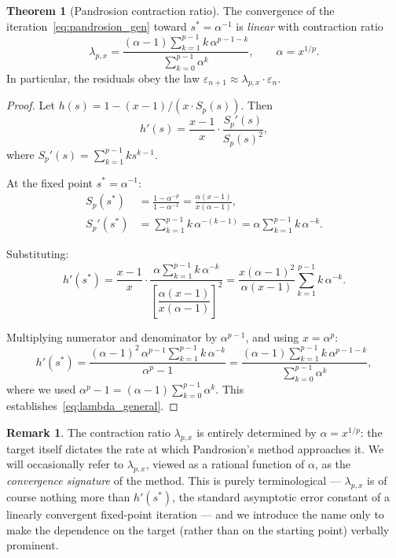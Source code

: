 \documentclass[11pt,a4paper]{article}
\theoremstyle{definition}
\newtheorem{theorem}{Theorem}[section]
\newtheorem{remark}{Remark}[section]
\newcommand{\eps}{\varepsilon}
\begin{document}
\begin{theorem}[Pandrosion contraction ratio]
\label{thm:lambda}
The convergence of the iteration~\eqref{eq:pandrosion_gen} toward $s^* = \alpha^{-1}$ is \emph{linear} with contraction ratio
\begin{equation}
  \label{eq:lambda_general}
  \boxed{
  \lambda_{p,x} = \frac{(\alpha - 1)\displaystyle\sum_{k=1}^{p-1} k\,\alpha^{p-1-k}}{\displaystyle\sum_{k=0}^{p-1} \alpha^k}
  }, \qquad \alpha = x^{1/p}.
\end{equation}
In particular, the residuals obey the law $\eps_{n+1} \approx \lambda_{p,x} \cdot \eps_n$.
\end{theorem}

\begin{proof}
Let $h(s) = 1 - (x-1)/(x \cdot S_p(s))$. Then
\[
  h'(s) = \frac{x-1}{x} \cdot \frac{S_p'(s)}{S_p(s)^2},
\]
where $S_p'(s) = \sum_{k=1}^{p-1} k s^{k-1}$.

At the fixed point $s^* = \alpha^{-1}$:
\begin{align*}
  S_p(s^*) &= \frac{1 - \alpha^{-p}}{1 - \alpha^{-1}} = \frac{\alpha(x-1)}{x(\alpha-1)}, \\
  S_p'(s^*) &= \sum_{k=1}^{p-1} k\,\alpha^{-(k-1)} = \alpha \sum_{k=1}^{p-1} k\,\alpha^{-k}.
\end{align*}

Substituting:
\[
  h'(s^*) = \frac{x-1}{x} \cdot \frac{\alpha \sum_{k=1}^{p-1} k\,\alpha^{-k}}{\left[\dfrac{\alpha(x-1)}{x(\alpha-1)}\right]^2}
  = \frac{x(\alpha-1)^2}{\alpha(x-1)} \sum_{k=1}^{p-1} k\,\alpha^{-k}.
\]

Multiplying numerator and denominator by $\alpha^{p-1}$, and using $x = \alpha^p$:
\[
  h'(s^*) = \frac{(\alpha-1)^2\,\alpha^{p-1}\sum_{k=1}^{p-1}k\,\alpha^{-k}}{\alpha^p - 1}
  = \frac{(\alpha-1)\sum_{k=1}^{p-1}k\,\alpha^{p-1-k}}{\sum_{k=0}^{p-1}\alpha^k},
\]
where we used $\alpha^p - 1 = (\alpha-1)\sum_{k=0}^{p-1}\alpha^k$. This establishes~\eqref{eq:lambda_general}.
\end{proof}

\begin{remark}
The contraction ratio $\lambda_{p,x}$ is entirely determined by $\alpha = x^{1/p}$: the target itself dictates the rate at which Pandrosion's method approaches it. We will occasionally refer to $\lambda_{p,x}$, viewed as a rational function of $\alpha$, as the \emph{convergence signature} of the method. This is purely terminological --- $\lambda_{p,x}$ is of course nothing more than $h'(s^*)$, the standard asymptotic error constant of a linearly convergent fixed-point iteration --- and we introduce the name only to make the dependence on the target (rather than on the starting point) verbally prominent.
\end{remark}
\end{document}
